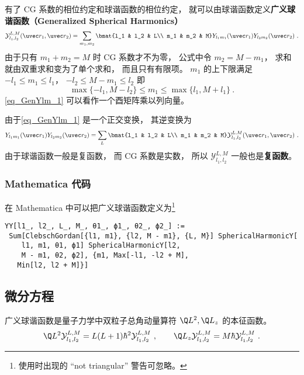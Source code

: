 
有了 CG 系数的相位约定和球谐函数的相位约定， 就可以由球谐函数定义\textbf{广义球谐函数（Generalized Spherical Harmonics）}
\begin{equation}\label{eq_GenYlm_1}
\mathcal{Y}_{l_1,l_2}^{L,M}(\uvec r_1, \uvec r_2) = \sum_{m_1, m_2} \bmat{l_1 & l_2 & L\\ m_1 & m_2 & M} Y_{l_1 m_1}(\uvec r_1) Y_{l_2 m_2} (\uvec r_2)~.
\end{equation}
由于只有 $m_1 + m_2 = M$ 时 CG 系数才不为零， 公式中令 $m_2 = M - m_1$， 求和就由双重求和变为了单个求和， 而且只有有限项。 $m_1$ 的上下限满足 $-l_1 \leqslant m_1 \leqslant l_1$， $-l_2 \leqslant M-m_1 \leqslant l_2$ 即
\begin{equation}
\max\{-l_1, M-l_2\} \leqslant m_1 \leqslant \max\{l_1, M+l_1\}~.
\end{equation}
\autoref{eq_GenYlm_1} 可以看作一个酉矩阵乘以列向量。

由于\autoref{eq_GenYlm_1} 是一个正交变换， 其逆变换为
\begin{equation}
Y_{l_1 m_1}(\uvec r_1) Y_{l_2 m_2} (\uvec r_2) = \sum_{L} \bmat{l_1 & l_2 & L\\ m_1 & m_2 & M} \mathcal{Y}_{l_1,l_2}^{L,M}(\uvec r_1, \uvec r_2)~.
\end{equation}
由于球谐函数一般是复函数， 而 CG 系数是实数， 所以 $\mathcal{Y}_{l_1,l_2}^{L,M}$ 一般也是\textbf{复函数}。

\subsubsection{Mathematica 代码}
在 Mathematica 中可以把广义球谐函数定义为\footnote{使用时出现的 “not triangular” 警告可忽略。}
\begin{lstlisting}[language=mma]
YY[l1_, l2_, L_, M_, θ1_, ϕ1_, θ2_, ϕ2_] := 
 Sum[ClebschGordan[{l1, m1}, {l2, M - m1}, {L, M}] SphericalHarmonicY[
    l1, m1, θ1, ϕ1] SphericalHarmonicY[l2, 
    M - m1, θ2, ϕ2], {m1, Max[-l1, -l2 + M], 
   Min[l2, l2 + M]}]
\end{lstlisting}

\subsection{微分方程}
广义球谐函数是量子力学中双粒子总角动量算符 $\Q L^2, \Q L_z$ 的本征函数。
\begin{equation}\label{eq_GenYlm_2}
\Q L^2 \mathcal Y_{l_1,l_2}^{L,M} = L(L+1) \hbar^2 \mathcal Y_{l_1,l_2}^{L,M}~,
\qquad
\Q L_z \mathcal Y_{l_1,l_2}^{L,M} = M\hbar \mathcal Y_{l_1,l_2}^{L,M}~.
\end{equation}


